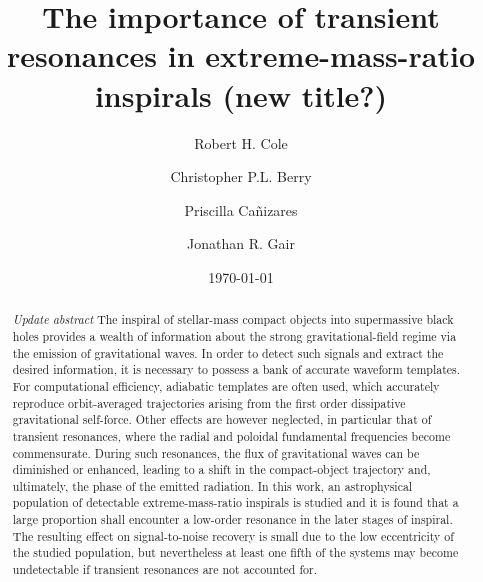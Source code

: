 \documentclass[aps,prd,amsfonts,amssymb,amsmath,nofootinbib,showpacs,superscriptaddress,twocolumn]{revtex4}
\begin{document}

\title{The importance of transient resonances in extreme-mass-ratio inspirals (new title?)}

\author{Robert H. Cole}
\author{Christopher P.L. Berry}
\author{Priscilla Ca\~{n}izares}
\author{Jonathan R. Gair}

\date{\today}

\begin{abstract}
\emph{Update abstract}
The inspiral of stellar-mass compact objects into supermassive black holes provides a wealth of information about the strong gravitational-field regime via the emission of gravitational waves. In order to detect such signals and extract the desired information, it is necessary to possess a bank of accurate waveform templates. For computational efficiency, adiabatic templates are often used, which accurately reproduce orbit-averaged trajectories arising from the first order dissipative gravitational self-force. Other effects are however neglected, in particular that of transient resonances, where the radial and poloidal fundamental frequencies become commensurate. During such resonances, the flux of gravitational waves can be diminished or enhanced, leading to a shift in the compact-object trajectory and, ultimately, the phase of the emitted radiation. In this work, an astrophysical population of detectable extreme-mass-ratio inspirals is studied and it is found that a large proportion shall encounter a low-order resonance in the later stages of inspiral. The resulting effect on signal-to-noise recovery is small due to the low eccentricity of the studied population, but nevertheless at least one fifth of the systems may become undetectable if transient resonances are not accounted for.
\end{abstract}

\end{document}
